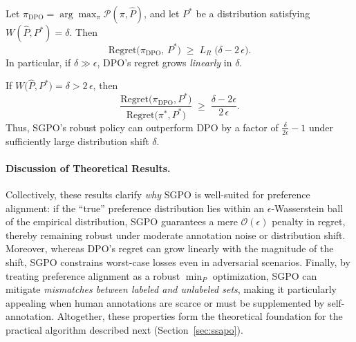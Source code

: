 \begin{theorem}
\label{thm:dpo_regret_lowerbound}
Let $\pi_{\mathrm{DPO}}=\arg\max_{\pi}\mathcal{P}(\pi,\hat{P})$, and let $P^*$ be a distribution satisfying $W(\hat{P},P^*)=\delta$.  Then
\begin{equation}
\text{Regret}\bigl(\pi_{\mathrm{DPO}},\,P^*\bigr)
\;\ge\;
L_R\;\bigl(\delta - 2\,\epsilon\bigr).
\end{equation}
In particular, if $\delta \gg \epsilon$, DPO’s regret grows \emph{linearly} in $\delta$.
\end{theorem}

\begin{corollary}
\label{cor:sgpo_advantage}
If $W\!\bigl(\hat{P},P^*\bigr)=\delta > 2\,\epsilon$, then
\begin{equation}
\frac{\text{Regret}\bigl(\pi_{\mathrm{DPO}},P^*\bigr)}%
     {\text{Regret}\bigl(\pi^{*},P^*\bigr)}
\;\ge\;
\frac{\delta - 2\epsilon}{2\,\epsilon}.
\end{equation}
Thus, SGPO’s robust policy can outperform DPO by a factor of $\tfrac{\delta}{2\epsilon} - 1$ under sufficiently large distribution shift $\delta$.
\end{corollary}

\paragraph{Discussion of Theoretical Results.}
Collectively, these results clarify \emph{why} SGPO is well-suited for preference alignment: if the “true” preference distribution lies within an $\epsilon$-Wasserstein ball of the empirical distribution, SGPO guarantees a mere $\mathcal{O}(\epsilon)$ penalty in regret, thereby remaining robust under moderate annotation noise or distribution shift.  Moreover, whereas DPO’s regret can grow linearly with the magnitude of the shift, SGPO constrains worst-case losses even in adversarial scenarios.  Finally, by treating preference alignment as a robust $\min_{P}$ optimization, SGPO can mitigate \emph{mismatches between labeled and unlabeled sets}, making it particularly appealing when human annotations are scarce or must be supplemented by self-annotation.  Altogether, these properties form the theoretical foundation for the practical algorithm described next (Section~\ref{sec:ssapo}). 

